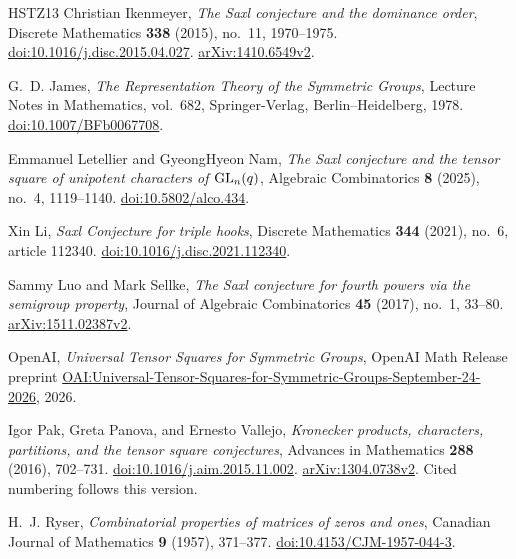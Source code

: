 \begin{thebibliography}{HSTZ13}
Christian Ikenmeyer,
\emph{The Saxl conjecture and the dominance order},
Discrete Mathematics \textbf{338} (2015), no.~11, 1970--1975.
\href{https://doi.org/10.1016/j.disc.2015.04.027}{doi:10.1016/j.disc.2015.04.027}.
\href{https://arxiv.org/abs/1410.6549v2}{arXiv:1410.6549v2}.

G.~D. James,
\emph{The Representation Theory of the Symmetric Groups},
Lecture Notes in Mathematics, vol.~682,
Springer-Verlag, Berlin--Heidelberg, 1978.
\href{https://doi.org/10.1007/BFb0067708}{doi:10.1007/BFb0067708}.

Emmanuel Letellier and GyeongHyeon Nam,
\emph{The Saxl conjecture and the tensor square of unipotent characters
of $\operatorname{GL}_n(q)$},
Algebraic Combinatorics \textbf{8} (2025), no.~4, 1119--1140.
\href{https://doi.org/10.5802/alco.434}{doi:10.5802/alco.434}.

Xin Li,
\emph{Saxl Conjecture for triple hooks},
Discrete Mathematics \textbf{344} (2021), no.~6, article 112340.
\href{https://doi.org/10.1016/j.disc.2021.112340}{doi:10.1016/j.disc.2021.112340}.

Sammy Luo and Mark Sellke,
\emph{The Saxl conjecture for fourth powers via the semigroup property},
Journal of Algebraic Combinatorics \textbf{45} (2017), no.~1, 33--80.
\href{https://arxiv.org/abs/1511.02387v2}{arXiv:1511.02387v2}.

OpenAI,
\emph{Universal Tensor Squares for Symmetric Groups},
OpenAI Math Release preprint
\href{https://github.com/openai/math/blob/main/preprints/Universal-Tensor-Squares-for-Symmetric-Groups-September-24-2026/main.pdf}{OAI:Universal-Tensor-Squares-for-Symmetric-Groups-September-24-2026},
2026.

Igor Pak, Greta Panova, and Ernesto Vallejo,
\emph{Kronecker products, characters, \mbox{partitions}, and the tensor square
conjectures},
Advances in Mathematics \textbf{288} (2016), 702--731.
\href{https://doi.org/10.1016/j.aim.2015.11.002}{doi:10.1016/j.aim.2015.11.002}.
\href{https://arxiv.org/abs/1304.0738v2}{arXiv:1304.0738v2}.
Cited numbering follows this version.

H.~J. Ryser,
\emph{Combinatorial properties of matrices of zeros and ones},
Canadian Journal of Mathematics \textbf{9} (1957), 371--377.
\href{https://doi.org/10.4153/CJM-1957-044-3}{doi:10.4153/CJM-1957-044-3}.

\end{thebibliography}
